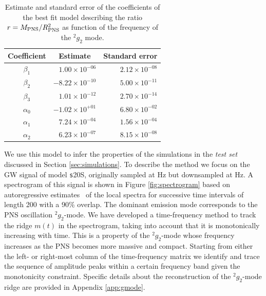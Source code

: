 
\begin{table}[h]

  \begin{tabular}{crr}
    \hline
    Coefficient & \multicolumn{1}{c}{Estimate} & Standard error \\
    \hline
   $\beta_1$  &  $ 1.00 \times 10^{-06}$ & $2.12 \times 10^{-08}$ \\   
   $\beta_2$  &  $-8.22 \times 10^{-10}$ & $5.00 \times 10^{-11}$ \\
   $\beta_3$  &  $ 1.01 \times 10^{-12}$ & $2.70 \times 10^{-14}$ \\
   $\alpha_0$ &  $-1.02 \times 10^{+01}$ & $6.80 \times 10^{-02}$ \\
   $\alpha_1$ &  $ 7.24 \times 10^{-04}$ & $1.56 \times 10^{-04}$ \\
   $\alpha_2$ &  $ 6.23 \times 10^{-07}$ & $8.15 \times 10^{-08}$ \\   
    \hline
  \end{tabular}
\caption{Estimate and standard error of the coefficients of the best fit model describing the ratio $r=M_{\rm PNS}/R_{\rm PNS}^2$ as function of the frequency of the $\mbox{}^2g_2$ mode.}\label{tab:model}
\end{table}



{We use this model to infer the properties of the simulations in the 
{\it test set} discussed in Section \ref{sec:simulations}.}
To describe the method we focus on the GW signal
of model {\texttt s20S}, originally
sampled at \unit[16384]{Hz} but downsampled at \unit[4096]{Hz}.
A spectrogram of this signal is shown in Figure \ref{fig:spectrogram} based on
autoregressive estimates~\cite{BrockwellPeterJ1991Tsta} of the local spectra for successive time intervals of 
length 200 with a 90\% overlap.
The dominant emission mode corresponds to the PNS oscillation $\mbox{}^2 g_2$-mode. We have
developed a time-frequency method to track the ridge $m(t) $ in the spectrogram,
taking into account that it is monotonically increasing with time. 
This is a property of the $\mbox{}^2 g_2$-mode whose frequency   
increases as the PNS becomes more massive and compact.
Starting from either the left- or right-most column of the time-frequency matrix
we identify and trace the sequence of amplitude peaks within a certain frequency
band given the monotonicity constraint. Specific details about the reconstruction of the $\mbox{}^2 g_2$-mode ridge 
are provided in Appendix \ref{app:gmode}. 

